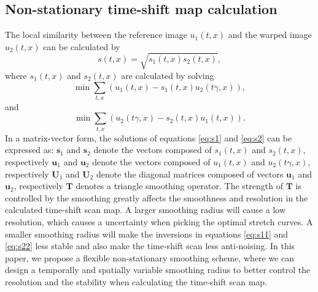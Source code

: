 \subsection{Non-stationary time-shift map calculation}
The local similarity between the reference image $u_1(t,x)$ and the warped image $u_2(t,x)$ can be calculated by
\begin{equation}
\label{eq:simi}
s(t,x)=\sqrt{s_1(t,x)s_2(t,x)},
\end{equation}
where $s_1(t,x)$ and $s_2(t,x)$ are calculated by solving
\begin{equation}
\label{eq:s1}
\min \sum_{t,x}\left(u_1(t,x)-s_1(t,x)u_2(t\gamma,x)\right),
\end{equation}
and
\begin{equation}
\label{eq:s2}
\min \sum_{t,x}\left(u_2(t\gamma,x)-s_2(t,x)u_1(t,x)\right).
\end{equation}
In a matrix-vector form, the solutions of equations \ref{eq:s1} and \ref{eq:s2} can be expressed as:
 $\mathbf{s}_1$ and $\mathbf{s}_2$ denote the vectors composed of $s_1(t,x)$ and $s_2(t,x)$, respectively\new{;} $\mathbf{u}_1$ and $\mathbf{u}_2$ denote the vectors composed of $u_1(t,x)$ and $u_2(t\gamma,x)$, respectively\new{;} $\mathbf{U}_1$ and $\mathbf{U}_2$ denote the diagonal matrices composed of vectors $\mathbf{u}_1$ and $\mathbf{u}_2$, respectively $\mathbf{T}$ denotes a triangle smoothing operator. The strength of $\mathbf{T}$ is controlled by the smoothing  greatly affects the smoothness and resolution in the calculated time-shift scan map. A larger smoothing radius will cause a low resolution, which causes a  uncertainty when picking the optimal stretch curves. A smaller smoothing radius will make the inversions in equations \ref{eq:s11} and \ref{eq:s22} less stable and also make the time-shift scan less anti-noising.  In this paper, we propose a flexible non-stationary smoothing scheme, where we can design a temporally and spatially variable smoothing radius to better control the resolution and the stability when calculating the time-shift scan map.

